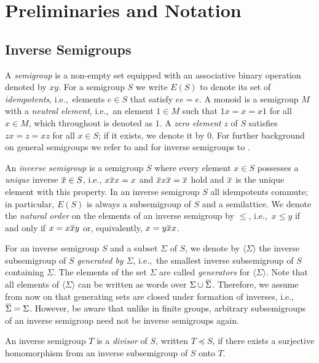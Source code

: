 \documentclass[anonymous,letter,UKenglish,cleveref,autoref,thm-restate]{lipics-v2021}
\renewcommand{\leq}{\leqslant}
\newcommand{\ie}{i.e.,~}
\newcommand{\gen}[1]{\langle #1 \rangle}
\newcommand\nindent{.5pt}
\newcommand\noverline[1]{\kern\nindent\overline{\kern-\nindent#1\kern-\nindent}\kern\nindent}
\newcommand{\ov}[1]{\noverline{#1}}
\theoremstyle{plain}
\theoremstyle{plain}
\begin{document}
\section{Preliminaries and Notation}\label{sec:prelims}

\subsection{Inverse Semigroups}\label{sec:prelims-inverse}

A \emph{semigroup} is a non-empty set equipped with an associative binary
operation denoted by $xy$.
For a semigroup $S$ we write $E(S)$ to denote its set of \emph{idempotents}, \ie elements $e \in S$ that satisfy $e e = e$.
A  monoid is a semigroup $M$ with a \emph{neutral element}, \ie{}an element $1 \in M$ such that $1x = x = x1$ for all $x \in M$, which throughout is denoted as $1$.
A \emph{zero element} $z$ of $S$ satisfies $zx = z = xz$ for all $x \in S$; if it exists, we denote it by $0$.
For further background on general semigroups we refer to  \cite{cp67,alm94,rs09qtheory} and for inverse semigroups to \cite{Petrich84,Law99}.

An \emph{inverse semigroup} is a semigroup $S$ where every element $x \in S$  possesses a \emph{unique} inverse $\ov x \in S$, i.e., $x \ov x x = x$ and $\ov x x \ov x = \ov x$ hold and $\ov x$ is the unique element with this property.
In an inverse semigroup $S$ all idempotents commute; in particular, $E(S)$ is always a subsemigroup of $S$ and a semilattice.
We denote the \emph{natural order} on the elements of an inverse semigroup by $\leq$, \ie $x \leq y$ if and only if $x =  x \ov x y$ or, equivalently, $x = y \ov x x$.


For an inverse semigroup $S$ and a subset $\Sigma$ of $S$, we denote by $\gen{\Sigma}$ the inverse subsemigroup of $S$ \emph{generated by $\Sigma$}, \ie the smallest inverse subsemigroup of $S$ containing $\Sigma$. 
The elements of the set $\Sigma$ are called \emph{generators} for $\gen{\Sigma}$.
Note that all elements of $\gen{\Sigma}$ can be written as words over $\Sigma \cup \ov{\Sigma}$.
Therefore, we assume from now on that generating sets are closed under formation of inverses, i.e., $\ov\Sigma = \Sigma$.
However, be aware that unlike in finite groups, arbitrary subsemigroups of an inverse semigroup need not be inverse semigroups again. 

An inverse semigroup $T$ is a \emph{divisor} of $S$, written $T \preccurlyeq S$, if there exists a surjective homomorphism from an inverse subsemigroup of $S$ onto $T$.
\end{document}
